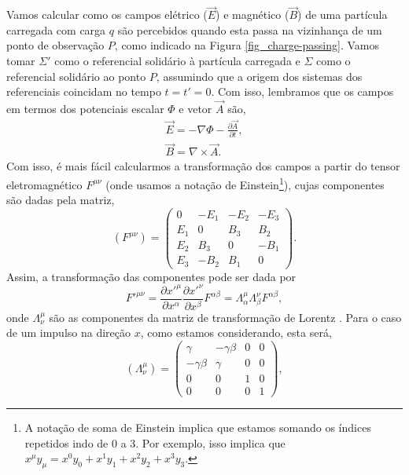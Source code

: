 Vamos calcular como os campos elétrico ($\vec{E}$) e magnético ($\vec{B}$) de
uma partícula carregada com carga $q$ são percebidos quando esta passa na
vizinhança de um ponto de observação $P$, como indicado na Figura
\ref{fig_charge-passing}. Vamos tomar $\Sigma '$ como o referencial solidário à
partícula carregada e $\Sigma$ como o referencial solidário ao ponto $P$,
assumindo que a origem dos sistemas dos referenciais coincidam no tempo
$t=t'=0$. Com isso, lembramos que os campos em termos dos potenciais escalar
$\Phi$ e vetor $\vec{A}$ são,
\begin{gather}
	\vec{E} = - \nabla \Phi - \frac{\partial \vec{A}}{\partial t}, \\
	\vec{B} = \nabla \times \vec{A}.
\end{gather}
Com isso, é mais fácil calcularmos a transformação dos campos a partir do
tensor eletromagnético $F^{\mu \nu}$ (onde usamos a notação de
Einstein\footnote{A notação de soma de Einstein implica que estamos somando os
índices repetidos indo de 0 a 3. Por exemplo, isso implica que $x^\mu y_\mu =
x^0 y_0 + x^1 y_1 + x^2 y_2 + x^3 y_3$.}), cujas componentes são dadas pela
matriz,
\begin{equation}
    (F^{\mu \nu}) = \begin{pmatrix}
		0 & -E_1 & -E_2 & -E_3 \\
		E_1 & 0 & B_3 & B_2 \\
		E_2 & B_3 & 0 & -B_1 \\
		E_3 & -B_2 & B_1 & 0
	\end{pmatrix}.
\end{equation}
Assim, a transformação das componentes pode ser dada por
\begin{equation}
    {F'}^{\mu \nu} = \frac{\partial {x'}^\mu}{\partial x^ \alpha}
    \frac{\partial {x'}^\nu}{\partial x^\beta}F^{\alpha \beta} = \Lambda ^\mu
    _\alpha \Lambda ^\nu _\beta F^{\alpha \beta},
    \label{eq_tensor_trans}
\end{equation}
onde $\Lambda ^\mu _\nu$ são as componentes da matriz de transformação de
Lorentz \cite{nivaldo_cap6}. Para o caso de um impulso na direção $x$, como
estamos considerando, esta será,
\begin{equation}
	(\Lambda ^\mu _\nu) = \begin{pmatrix}
		\gamma & -\gamma \beta & 0 & 0 \\
		-\gamma \beta & \gamma & 0 & 0 \\
		0 & 0 & 1 & 0 \\
		0 & 0 & 0 & 1
	\end{pmatrix},
\end{equation}
